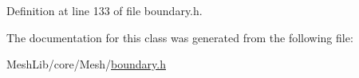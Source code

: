 Definition at line 133 of file boundary.\+h.



The documentation for this class was generated from the following file\+:\begin{DoxyCompactItemize}
\item 
Mesh\+Lib/core/\+Mesh/\hyperlink{boundary_8h}{boundary.\+h}\end{DoxyCompactItemize}
